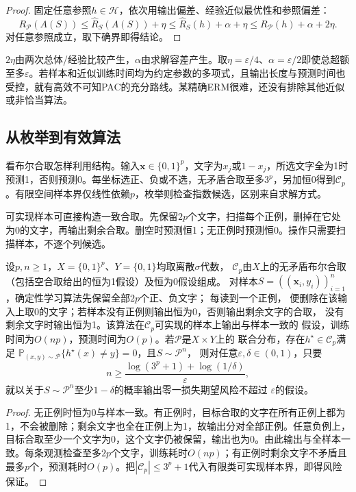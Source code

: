 \begin{proof}
固定任意参照$h\in\mathcal H$，依次用输出偏差、经验近似最优性和参照偏差：
\[
 R_{\mathcal P}(A(S))
 \leq\hat R_S(A(S))+\eta
 \leq\hat R_S(h)+\alpha+\eta
 \leq R_{\mathcal P}(h)+\alpha+2\eta.
\]
对任意参照成立，取下确界即得结论。
\end{proof}

$2\eta$由两次总体/经验比较产生，$\alpha$由求解容差产生。取$\eta=\varepsilon/4$、$\alpha=\varepsilon/2$即使总超额至多$\varepsilon$。若样本和近似训练时间均为约定参数的多项式，且输出长度与预测时间也受控，就有高效不可知PAC的充分路线。某精确ERM很难，还没有排除其他近似或非恰当算法。

\subsection{从枚举到有效算法}

看布尔合取怎样利用结构。输入$\bm x\in\{0,1\}^p$，文字为$x_j$或$1-x_j$，所选文字全为1时预测1，否则预测0。每坐标选正、负或不选，无矛盾合取至多$3^p$，另加恒0得到$\mathcal C_p$。有限空间样本界仅线性依赖$p$，枚举则检查指数候选，区别来自求解方式。

可实现样本可直接构造一致合取。先保留$2p$个文字，扫描每个正例，删掉在它处为0的文字，再输出剩余合取。删空时预测恒1；无正例时预测恒0。操作只需要扫描样本，不逐个列候选。

\begin{theorem}[布尔合取的高效可实现学习]
\label{thm:efficient-conjunction-learning}
设$p,n\geq1$，$X=\{0,1\}^p$、$Y=\{0,1\}$均取离散$\sigma$代数，
$\mathcal C_p$由$X$上的无矛盾布尔合取（包括空合取给出的恒为1假设）及恒为0假设组成。
对样本$S=((\bm x_i,y_i))_{i=1}^n$，确定性学习算法先保留全部$2p$个正、负文字；
每读到一个正例，
便删除在该输入上取0的文字；若样本没有正例则输出恒为0，否则输出剩余文字的合取，
没有剩余文字时输出恒为1。该算法在$\mathcal C_p$可实现的样本上输出与样本一致的
假设，训练时间为$O(np)$，预测时间为$O(p)$。若$\mathcal P$是$X\times Y$上的
联合分布，存在$h^\star\in\mathcal C_p$满足
$\mathbb P_{(x,y)\sim\mathcal P}\{h^\star(x)\neq y\}=0$，且$S\sim\mathcal P^n$，
则对任意$\varepsilon,\delta\in(0,1)$，只要
\[
 n\geq\frac{\log(3^p+1)+\log(1/\delta)}{\varepsilon},
\]
就以关于$S\sim\mathcal P^n$至少$1-\delta$的概率输出零一损失期望风险不超过
$\varepsilon$的假设。
\end{theorem}

\begin{proof}
无正例时恒为0与样本一致。有正例时，目标合取的文字在所有正例上都为1，不会被删除；剩余文字也全在正例上为1，故输出分对全部正例。任意负例上，目标合取至少一个文字为0，这个文字仍被保留，输出也为0。由此输出与全样本一致。每条观测检查至多$2p$个文字，训练耗时$O(np)$；有正例时剩余文字不矛盾且最多$p$个，预测耗时$O(p)$。把$|\mathcal C_p|\leq3^p+1$代入有限类可实现样本界，即得风险保证。
\end{proof}

